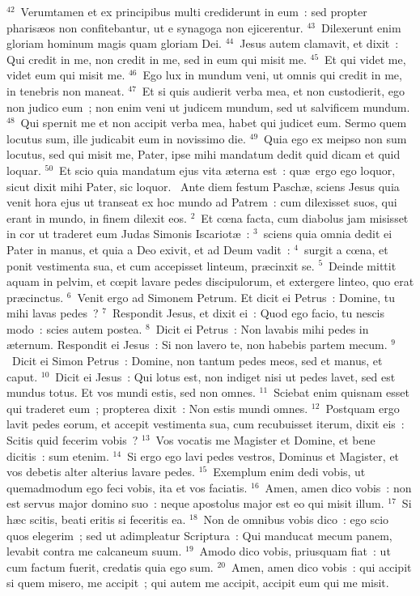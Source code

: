 ${}^{42}$~Verumtamen et ex principibus multi crediderunt in eum~: sed propter pharis\ae os non confitebantur, ut e synagoga non ejicerentur.
${}^{43}$~Dilexerunt enim gloriam hominum magis quam gloriam Dei.
${}^{44}$~Jesus autem clamavit, et dixit~: Qui credit in me, non credit in me, sed in eum qui misit me.
${}^{45}$~Et qui videt me, videt eum qui misit me.
${}^{46}$~Ego lux in mundum veni, ut omnis qui credit in me, in tenebris non maneat.
${}^{47}$~Et si quis audierit verba mea, et non custodierit, ego non judico eum~; non enim veni ut judicem mundum, sed ut salvificem mundum.
${}^{48}$~Qui spernit me et non accipit verba mea, habet qui judicet eum. Sermo quem locutus sum, ille judicabit eum in novissimo die.
${}^{49}$~Quia ego ex meipso non sum locutus, sed qui misit me, Pater, ipse mihi mandatum dedit quid dicam et quid loquar.
${}^{50}$~Et scio quia mandatum ejus vita \ae terna est~: qu\ae\ ergo ego loquor, sicut dixit mihi Pater, sic loquor.
~Ante diem festum Pasch\ae , sciens Jesus quia venit hora ejus ut transeat ex hoc mundo ad Patrem~: cum dilexisset suos, qui erant in mundo, in finem dilexit eos.
${}^{2}$~Et cœna facta, cum diabolus jam misisset in cor ut traderet eum Judas Simonis Iscariot\ae~:
${}^{3}$~sciens quia omnia dedit ei Pater in manus, et quia a Deo exivit, et ad Deum vadit~:
${}^{4}$~surgit a cœna, et ponit vestimenta sua, et cum accepisset linteum, pr\ae cinxit se.
${}^{5}$~Deinde mittit aquam in pelvim, et cœpit lavare pedes discipulorum, et extergere linteo, quo erat pr\ae cinctus.
${}^{6}$~Venit ergo ad Simonem Petrum. Et dicit ei Petrus~: Domine, tu mihi lavas pedes~?
${}^{7}$~Respondit Jesus, et dixit ei~: Quod ego facio, tu nescis modo~: scies autem postea.
${}^{8}$~Dicit ei Petrus~: Non lavabis mihi pedes in \ae ternum. Respondit ei Jesus~: Si non lavero te, non habebis partem mecum.
${}^{9}$~Dicit ei Simon Petrus~: Domine, non tantum pedes meos, sed et manus, et caput.
${}^{10}$~Dicit ei Jesus~: Qui lotus est, non indiget nisi ut pedes lavet, sed est mundus totus. Et vos mundi estis, sed non omnes.
${}^{11}$~Sciebat enim quisnam esset qui traderet eum~; propterea dixit~: Non estis mundi omnes.
${}^{12}$~Postquam ergo lavit pedes eorum, et accepit vestimenta sua, cum recubuisset iterum, dixit eis~: Scitis quid fecerim vobis~?
${}^{13}$~Vos vocatis me Magister et Domine, et bene dicitis~: sum etenim.
${}^{14}$~Si ergo ego lavi pedes vestros, Dominus et Magister, et vos debetis alter alterius lavare pedes.
${}^{15}$~Exemplum enim dedi vobis, ut quemadmodum ego feci vobis, ita et vos faciatis.
${}^{16}$~Amen, amen dico vobis~: non est servus major domino suo~: neque apostolus major est eo qui misit illum.
${}^{17}$~Si h\ae c scitis, beati eritis si feceritis ea.
${}^{18}$~Non de omnibus vobis dico~: ego scio quos elegerim~; sed ut adimpleatur Scriptura~: Qui manducat mecum panem, levabit contra me calcaneum suum.
${}^{19}$~Amodo dico vobis, priusquam fiat~: ut cum factum fuerit, credatis quia ego sum.
${}^{20}$~Amen, amen dico vobis~: qui accipit si quem misero, me accipit~; qui autem me accipit, accipit eum qui me misit.


